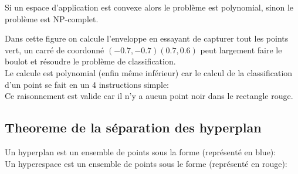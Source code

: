 Si un espace d'application est convexe alors le problème est polynomial, sinon le problème est NP-complet.\\


Dans cette figure on calcule l'enveloppe en essayant de capturer tout les points vert, un carré de coordonné $(-0.7,-0.7)(0.7,0.6)$ peut largement faire le boulot et résoudre le problème de classification.\\
Le calcule est polynomial (enfin même inférieur) car le calcul de la classification d'un point se fait en un 4 instructions simple:\\
Ce raisonnement est valide car il n'y a aucun point noir dans le rectangle rouge.\\

\pagebreak
\subsection{Theoreme de la séparation des hyperplan}

Un hyperplan est un ensemble de points sous la forme (représenté en blue):
\ \\
Un hyperespace est un ensemble de points sous le forme (représenté en rouge):

